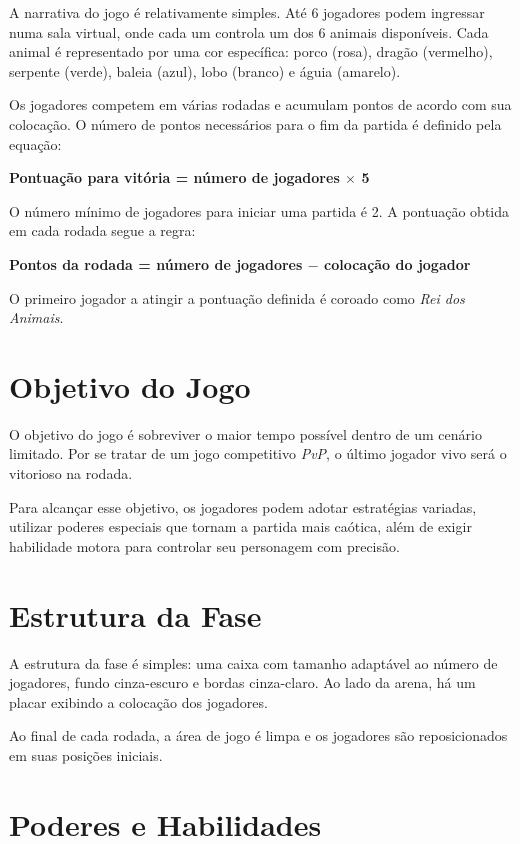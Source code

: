A narrativa do jogo é relativamente simples. Até 6 jogadores podem ingressar numa sala virtual, onde cada um controla um dos 6 animais disponíveis. Cada animal é representado por uma cor específica: porco (rosa), dragão (vermelho), serpente (verde), baleia (azul), lobo (branco) e águia (amarelo).

Os jogadores competem em várias rodadas e acumulam pontos de acordo com sua colocação. O número de pontos necessários para o fim da partida é definido pela equação:

\begin{center}
    \textbf{Pontuação para vitória = número de jogadores $\times$ 5}
\end{center}

O número mínimo de jogadores para iniciar uma partida é 2. A pontuação obtida em cada rodada segue a regra:

\begin{center}
    \textbf{Pontos da rodada = número de jogadores $-$ colocação do jogador}
\end{center}

O primeiro jogador a atingir a pontuação definida é coroado como \textit{Rei dos Animais}.

\section{Objetivo do Jogo}

O objetivo do jogo é sobreviver o maior tempo possível dentro de um cenário limitado. Por se tratar de um jogo competitivo \textit{PvP}, o último jogador vivo será o vitorioso na rodada.

Para alcançar esse objetivo, os jogadores podem adotar estratégias variadas, utilizar poderes especiais que tornam a partida mais caótica, além de exigir habilidade motora para controlar seu personagem com precisão.

\section{Estrutura da Fase}

A estrutura da fase é simples: uma caixa com tamanho adaptável ao número de jogadores, fundo cinza-escuro e bordas cinza-claro. Ao lado da arena, há um placar exibindo a colocação dos jogadores.

Ao final de cada rodada, a área de jogo é limpa e os jogadores são reposicionados em suas posições iniciais.

\section{Poderes e Habilidades}

